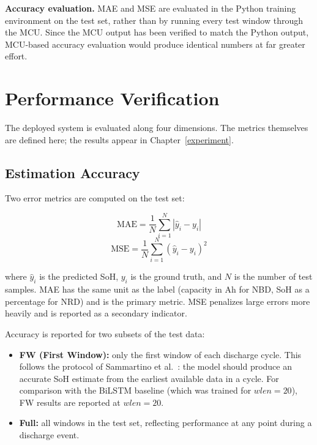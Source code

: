 \textbf{Accuracy evaluation.} MAE and MSE are evaluated in the Python training environment on the test set, rather than by running every test window through the MCU. Since the MCU output has been verified to match the Python output, MCU-based accuracy evaluation would produce identical numbers at far greater effort.


\section{Performance Verification}
\label{sec:ch3_verification}

The deployed system is evaluated along four dimensions. The metrics themselves are defined here; the results appear in Chapter~\ref{experiment}.

\subsection{Estimation Accuracy}

Two error metrics are computed on the test set:

\begin{equation}
\text{MAE} = \frac{1}{N} \sum_{i=1}^{N} |\hat{y}_i - y_i|
\end{equation}
\begin{equation}
\text{MSE} = \frac{1}{N} \sum_{i=1}^{N} (\hat{y}_i - y_i)^2
\end{equation}

where $\hat{y}_i$ is the predicted SoH, $y_i$ is the ground truth, and $N$ is the number of test samples. MAE has the same unit as the label (capacity in Ah for NBD, SoH as a percentage for NRD) and is the primary metric. MSE penalizes large errors more heavily and is reported as a secondary indicator.

Accuracy is reported for two subsets of the test data:

\begin{itemize}
    \item \textbf{FW (First Window):} only the first window of each discharge cycle. This follows the protocol of Sammartino et al.~\autocite{Sammartino2021}: the model should produce an accurate SoH estimate from the earliest available data in a cycle. For comparison with the BiLSTM baseline (which was trained for $wlen = 20$), FW results are reported at $wlen = 20$.
    \item \textbf{Full:} all windows in the test set, reflecting performance at any point during a discharge event.
\end{itemize}

